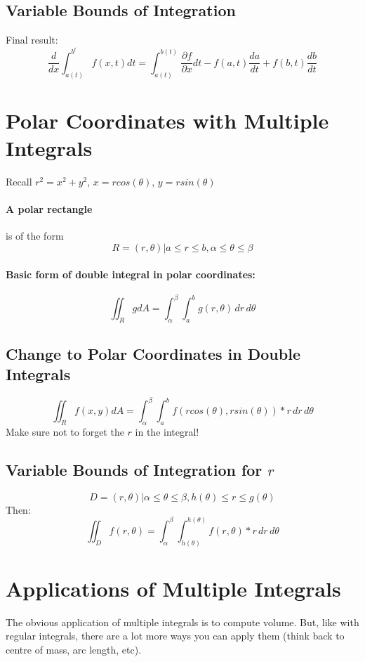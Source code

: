 \documentclass[a4paper,12pt]{report}
\begin{document}
\subsection{Variable Bounds of Integration}
Final result:
$$\frac{d}{dx} \int_{a(t)}^{b^t} f(x, t) dt = \int_{a(t)}^{b(t)} \frac{\partial f}{\partial x} dt - f(a, t)\frac{da}{dt} + f(b, t)\frac{db}{dt}$$

\section{Polar Coordinates with Multiple Integrals}
Recall $r^2 = x^2 + y^2$, $x = rcos(\theta)$, $y = rsin(\theta)$

\paragraph{A polar rectangle} is of the form $$R = {(r, \theta) | a \leq r \leq b, \alpha \leq \theta \leq \beta}$$

\paragraph{Basic form of double integral in polar coordinates: }
$$\iint_R g dA = \int_{\alpha}^{\beta} \int_a^b g(r, \theta)\,dr\,d\theta$$

\subsection{Change to Polar Coordinates in Double Integrals}
$$\iint_R f(x, y) dA = \int_{\alpha}^{\beta}\int_a^b f(rcos(\theta), rsin(\theta))*r \,dr\,d\theta$$
Make sure not to forget the $r$ in the integral!

\subsection{Variable Bounds of Integration for $r$}
$$D = {(r, \theta) | \alpha \leq \theta \leq \beta, h(\theta) \leq r \leq g(\theta)}$$
Then:
$$\iint_D f(r, \theta) = \int_{\alpha}^{\beta} \int_{h(\theta)}^{h(\theta)} f(r, \theta)*r \, dr \, d\theta$$

\section{Applications of Multiple Integrals}
The obvious application of multiple integrals is to compute volume. But, like with regular 
integrals, there are a lot more ways you can apply them (think back to centre of mass, 
arc length, etc). 
\end{document}
